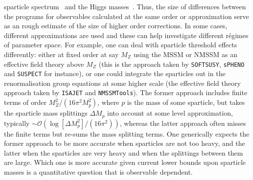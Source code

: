 \documentclass[final,3p,times,pdflatex]{elsarticle}
\def\code#1{{\tt #1}}
\begin{document}
sparticle spectrum~\cite{Allanach:2003jw} and the Higgs
masses~\cite{Allanach:2004rh,Staub:2015aea,deFlorian:2016spz}. Thus, the size of
differences between the programs for observables calculated at the same order
or approximation serve as an rough estimate of the size of higher order
corrections. In some cases, different approximations are used and these can
help investigate different r\'{e}gimes of parameter space. For example, one
can deal with sparticle threshold effects differently: either at fixed order
at say $M_Z$ using the MSSM or NMSSM as an effective field theory above $M_Z$
(this is the approach taken by \code{SOFTSUSY}, \code{sPHENO} and
\code{SUSPECT} for instance), or one could integrate the sparticles out in the
renormalisation group equations at some higher scale (the effective field theory approach taken by 
\code{ISAJET} and \code{NMSSMTools}). The former approach includes finite
terms of order $M_Z^2/(16 \pi^2 M_p^2)$, where $p$ is the mass of some
sparticle, but takes the sparticle mass splittings $\Delta M_p$ into account
at some level approximation, typically $\sim {\mathcal O}\left(\log [\Delta M_p^2] / (16 \pi^2)\right)$,
whereas the latter 
approach often misses the finite terms but re-sums the mass splitting terms. 
One generically expects the former approach to be more accurate when
sparticles are not too heavy, and the latter when the sparticles are very
heavy and when the splittings between them are large. Which one is more
accurate given current lower bounds upon sparticle masses is a quantitative
question that is observable dependent. 
\end{document}
